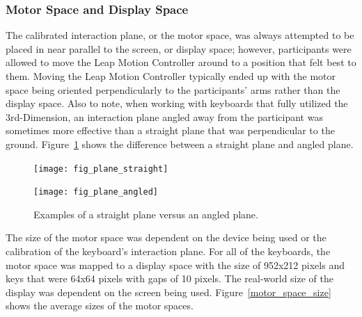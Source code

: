 \subsubsection{Motor Space and Display Space}
The calibrated interaction plane, or the motor space, was always attempted to be placed in near parallel to the screen, or display space; however, participants were allowed to move the Leap Motion Controller around to a position that felt best to them. Moving the Leap Motion Controller typically ended up with the motor space being oriented perpendicularly to the participants' arms rather than the display space. Also to note, when working with keyboards that fully utilized the 3rd-Dimension, an interaction plane angled away from the participant was sometimes more effective than a straight plane that was perpendicular to the ground. Figure~\ref{plane_angle} shows the difference between a straight plane and angled plane.

\begin{figure}[h]
	\centering
	\begin{minipage}[t]{4in}
		\begin{minipage}[t]{1.9in}
			\texttt{[image: fig\_plane\_straight]}
		\end{minipage}
		\begin{minipage}[t]{1.9in}
			\texttt{[image: fig\_plane\_angled]}
		\end{minipage}
	\end{minipage}
	\caption[Angled Plane]{Examples of a straight plane versus an angled plane.}
	\label{plane_angle}
\end{figure}

The size of the motor space was dependent on the device being used or the calibration of the keyboard's interaction plane. For all of the keyboards, the motor space was mapped to a display space with the size of 952x212 pixels and keys that were 64x64 pixels with gaps of 10 pixels. The real-world size of the display was dependent on the screen being used. Figure~\ref{motor_space_size} shows the average sizes of the motor spaces.

